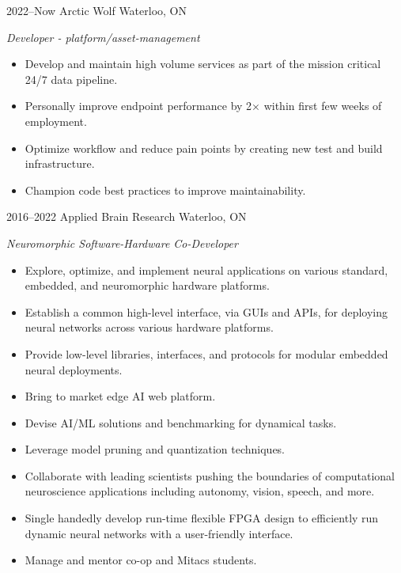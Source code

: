\documentclass[a4paper,nocolors]{cv-friggeri-ben}
\begin{document}
\begin{entrylist}

\entry
    {2022--Now}
    {Arctic Wolf}
    {Waterloo, ON}
    {\emph{Developer - platform/asset-management}
    \begin{itemize}
        \item Develop and maintain high volume services as part of the mission
            critical 24/7 data pipeline.
        \item Personally improve endpoint performance by 2$\times$ within first
            few weeks of employment.
        \item Optimize workflow and reduce pain points by creating new test and
            build infrastructure.
        \item Champion code best practices to improve maintainability.
    \end{itemize}}

\entry
    {2016--2022}
    {Applied Brain Research}
    {Waterloo, ON}
    {\emph{Neuromorphic Software-Hardware Co-Developer}
    \begin{itemize}
        \item Explore, optimize, and implement neural applications on various
            standard, embedded, and neuromorphic hardware platforms.
        \item Establish a common high-level interface, via GUIs and APIs, for
            deploying neural networks across various hardware platforms.
        \item Provide low-level libraries, interfaces, and protocols for
            modular embedded neural deployments.
        \item Bring to market edge AI web platform.
        \item Devise AI/ML solutions and benchmarking for dynamical tasks.
        \item Leverage model pruning and quantization techniques.
        \item Collaborate with leading scientists pushing the boundaries of
            computational neuroscience applications including autonomy, vision,
            speech, and more.
        \item Single handedly develop run-time flexible FPGA design to
            efficiently run dynamic neural networks with a user-friendly
            interface.
        \item Manage and mentor co-op and Mitacs students.
    \end{itemize}}


\end{entrylist}
\end{document}
